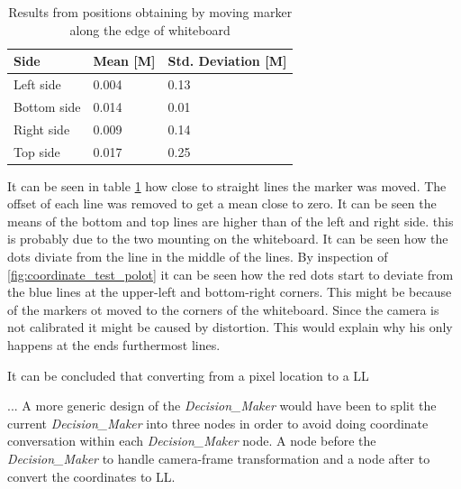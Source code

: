 \begin{table}[H]
\centering
\caption{Results from positions obtaining by moving marker along the edge of whiteboard}
\label{tab:converter_results}
\begin{tabular}{@{}|l|l|l|@{}}
\toprule
\textbf{Side} & \textbf{Mean [M]}  & \textbf{Std. Deviation {[}M{]}} \\ \midrule
Left side     & 0.004 & 0.13                   \\ \midrule
Bottom side   & 0.014 & 0.01                   \\ \midrule
Right side    & 0.009 & 0.14                   \\ \midrule
Top side      & 0.017 & 0.25                   \\ \bottomrule
\end{tabular}
\end{table}

It can be seen in table \ref{tab:converter_results} how close to straight lines the marker was moved. The offset of each line was removed to get a mean close to zero. It can be seen the means of the bottom and top lines are higher than of the left and right side. this is probably due to the two mounting on the whiteboard. It can be seen how the dots diviate from the line in the middle of the lines. By inspection of \ref{fig:coordinate_test_polot} it can be seen how the red dots start to deviate from the blue lines at the upper-left and bottom-right corners. This might be because of the markers  ot moved to the corners of the whiteboard. Since the camera is not calibrated it might be caused by distortion. This would explain why his only happens at the ends furthermost lines.

It can be concluded that converting from a pixel location  to a \ac{LL}


...
A more generic design of the \textit{Decision\_Maker} would have been to split the current \textit{Decision\_Maker} into three nodes in order to avoid doing coordinate conversation within each \textit{Decision\_Maker} node. A node before the \textit{Decision\_Maker} to handle camera-frame transformation and a node after to convert the coordinates to \ac{LL}.